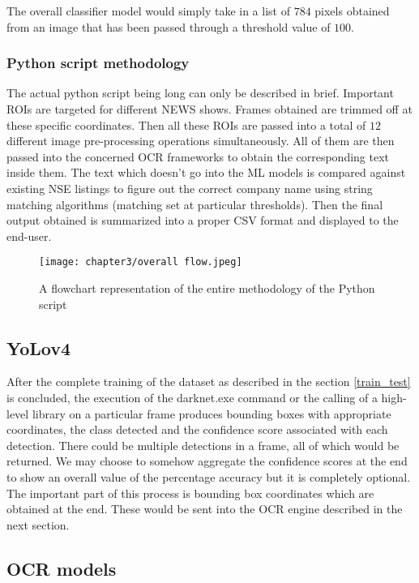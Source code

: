 The overall classifier model would simply take in a list of $784$ pixels obtained from an image that has been passed through a threshold value of $100$.

\subsubsection{Python script methodology}
The actual python script being long can only be described in brief. Important ROIs are targeted for different NEWS shows. Frames obtained are trimmed off at these specific coordinates. Then all these ROIs are passed into a total of $12$ different image pre-processing operations simultaneously. All of them are then passed into the concerned OCR frameworks to obtain the corresponding text inside them. The text which doesn’t go into the ML models is compared against existing NSE listings to figure out the correct company name using string matching algorithms (matching set at particular thresholds). Then the final output obtained is summarized into a proper CSV format and displayed to the end-user.

\begin{figure}[h]
  \centering
  \texttt{[image: chapter3/overall flow.jpeg]}
  \caption{A flowchart representation of the entire methodology of the Python script}
  \label{fig:process_flow_python}
\end{figure}

\subsection{YoLov4} \label{yv4}

After the complete training of the dataset as described in the section \ref{train_test} is concluded, the execution of the {\selectfont darknet.exe} command or the calling of a high-level library on a particular frame produces bounding boxes with appropriate coordinates, the class detected and the confidence score associated with each detection. There could be multiple detections in a frame, all of which would be returned. We may choose to somehow aggregate the confidence scores at the end to show an overall value of the percentage accuracy but it is completely optional. The important part of this process is bounding box coordinates which are obtained at the end. These would be sent into the OCR engine described in the next section.

\subsection{OCR models}

